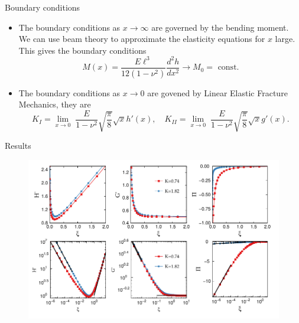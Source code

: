 \documentclass{beamer}
\begin{document}
\begin{frame}{Boundary conditions}
\begin{itemize}
\item The boundary conditions as $x \to \infty$ are governed by the bending 
      moment. We can use beam theory to approximate the elasticity equations 
      for $x$ large. This gives the boundary conditions
      $$ M(x) = \frac{E \ell^3}{12(1- \nu^2)} \frac{d^2 h}{dx^2} \to M_0 = 
      \mbox{ const.}$$
\item The boundary conditions as $x \to 0$ are govened by Linear Elastic 
      Fracture Mechanics, they are
      \[K_I = \lim_{x\to 0} \; \frac{E}{1-\nu^2}\sqrt{\frac{\pi}{8}} \sqrt{x}
      h'(x), \quad K_{II} = \lim_{x\to 0} \; \frac{E}{1-\nu^2}
      \sqrt{\frac{\pi}{8}} \sqrt{x} g'(x). \]
     
\end{itemize}
\end{frame}

\begin{frame}{Results}
\begin{figure}
  \centerline{\includegraphics[scale=0.8]{hprime-p-x-full.pdf}}
\end{figure}
\end{frame}
\end{document}
